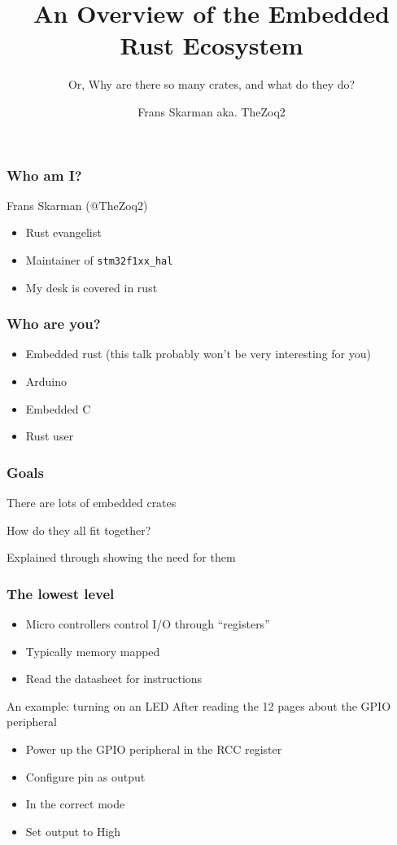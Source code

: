 \documentclass[169]{beamer}
\title{An Overview of the Embedded Rust Ecosystem}
\subtitle{Or, Why are there so many crates, and what do they do?}
\author{Frans Skarman aka. TheZoq2}
\begin{document}
\maketitle

\begin{frame}
    \frametitle{Who am I?}
    
    Frans Skarman (@TheZoq2)

    \begin{itemize}
        \item Rust evangelist
        \item Maintainer of \texttt{stm32f1xx\_hal}
        \item My desk is covered in rust
    \end{itemize}
\end{frame}

\begin{frame}
    \frametitle{Who are you?}

    \begin{itemize}
        \item Embedded rust (this talk probably won't be very interesting for you)
        \item Arduino
        \item Embedded C
        \item Rust user
    \end{itemize}
\end{frame}

\begin{frame}
    \frametitle{Goals}

    There are lots of embedded crates

    How do they all fit together?

    Explained through showing the need for them
\end{frame}

\begin{frame}
    \frametitle{The lowest level}

    \begin{itemize}
        \item Micro controllers control I/O through ``registers''
        \item Typically memory mapped
        \item Read the datasheet for instructions
    \end{itemize}
\end{frame}

\begin{frame}{An example: turning on an LED}
    After reading the 12 pages about the GPIO peripheral
    \begin{itemize}
        \item{Power up the GPIO peripheral in the RCC register}
        \item{Configure pin as output}
        \item{In the correct mode}
        \item{Set output to High}
    \end{itemize}
\end{frame}
\end{document}
